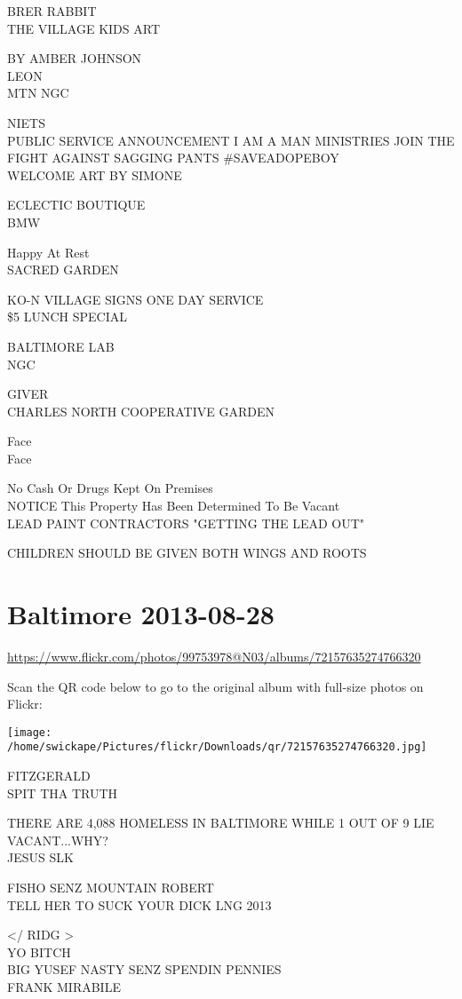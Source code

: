 \documentclass[10pt,letterpaper]{article}
\begin{document}
BRER RABBIT\\
THE VILLAGE KIDS ART

BY AMBER JOHNSON\\
LEON\\
MTN NGC

NIETS\\
PUBLIC SERVICE ANNOUNCEMENT I AM A MAN MINISTRIES JOIN THE FIGHT AGAINST SAGGING PANTS \#SAVEADOPEBOY\\
WELCOME ART BY SIMONE

ECLECTIC BOUTIQUE\\
BMW

Happy At Rest\\
SACRED GARDEN

KO{-}N VILLAGE SIGNS ONE DAY SERVICE\\
\$5 LUNCH SPECIAL

BALTIMORE LAB\\
NGC

GIVER\\
CHARLES NORTH COOPERATIVE GARDEN

Face\\
Face

No Cash Or Drugs Kept On Premises\\
NOTICE This Property Has Been Determined To Be Vacant\\
LEAD PAINT CONTRACTORS "GETTING THE LEAD OUT"

CHILDREN SHOULD BE GIVEN BOTH WINGS AND ROOTS


\section*{Baltimore 2013-08-28}

\url{https://www.flickr.com/photos/99753978@N03/albums/72157635274766320}

Scan the QR code below to go to the original album with full-size photos on Flickr:

\texttt{[image: /home/swickape/Pictures/flickr/Downloads/qr/72157635274766320.jpg]}


FITZGERALD\\
SPIT THA TRUTH

THERE ARE 4,088 HOMELESS IN BALTIMORE WHILE 1 OUT OF 9 LIE VACANT...WHY?\\
JESUS SLK

FISHO SENZ MOUNTAIN ROBERT\\
TELL HER TO SUCK YOUR DICK LNG 2013

</  RIDG >\\
YO BITCH\\
BIG YUSEF NASTY SENZ SPENDIN PENNIES\\
FRANK MIRABILE
\end{document}

